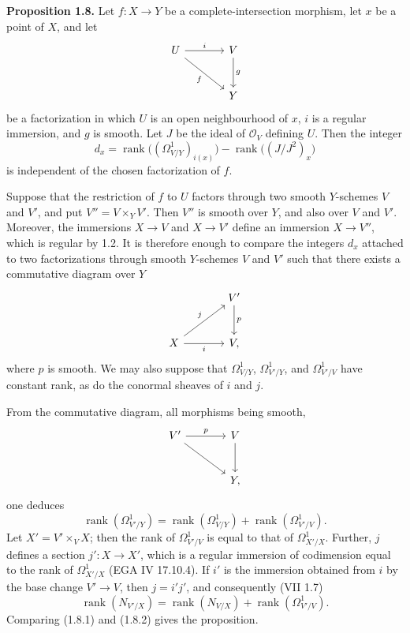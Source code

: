 \textbf{Proposition 1.8.} Let $f:X\to Y$ be a complete-intersection morphism, let $x$ be a point of $X$, and let
\[
\begin{tikzcd}[column sep=large,row sep=large]
U \arrow[r,"i"] \arrow[dr,"f"'] & V \arrow[d,"g"]\\
& Y
\end{tikzcd}
\]
be a factorization in which $U$ is an open neighbourhood of $x$, $i$ is a regular immersion, and $g$ is smooth. Let $J$ be the ideal of $\mathcal O_V$ defining $U$. Then the integer
\[
d_x=\operatorname{rank}\bigl((\Omega^1_{V/Y})_{i(x)}\bigr)-\operatorname{rank}\bigl((J/J^2)_x\bigr)
\]
is independent of the chosen factorization of $f$.

Suppose that the restriction of $f$ to $U$ factors through two smooth $Y$-schemes $V$ and $V'$, and put $V''=V\times_Y V'$. Then $V''$ is smooth over $Y$, and also over $V$ and $V'$. Moreover, the immersions $X\to V$ and $X\to V'$ define an immersion $X\to V''$, which is regular by 1.2. It is therefore enough to compare the integers $d_x$ attached to two factorizations through smooth $Y$-schemes $V$ and $V'$ such that there exists a commutative diagram over $Y$
\[
\begin{tikzcd}[column sep=large,row sep=large]
& V' \arrow[d,"p"]\\
X \arrow[ur,"j"] \arrow[r,"i"'] & V,
\end{tikzcd}
\]
where $p$ is smooth. We may also suppose that $\Omega^1_{V/Y}$, $\Omega^1_{V'/Y}$, and $\Omega^1_{V'/V}$ have constant rank, as do the conormal sheaves of $i$ and $j$.

From the commutative diagram, all morphisms being smooth,
\[
\begin{tikzcd}[column sep=large,row sep=large]
V' \arrow[r,"p"] \arrow[dr] & V \arrow[d]\\
& Y,
\end{tikzcd}
\]
one deduces
\begin{equation}\tag{1.8.1}
\operatorname{rank}(\Omega^1_{V'/Y})=
\operatorname{rank}(\Omega^1_{V/Y})+
\operatorname{rank}(\Omega^1_{V'/V}).
\end{equation}
Let $X'=V'\times_V X$; then the rank of $\Omega^1_{V'/V}$ is equal to that of $\Omega^1_{X'/X}$. Further, $j$ defines a section $j':X\to X'$, which is a regular immersion of codimension equal to the rank of $\Omega^1_{X'/X}$ (EGA IV 17.10.4). If $i'$ is the immersion obtained from $i$ by the base change $V'\to V$, then $j=i'j'$, and consequently (VII 1.7)
\begin{equation}\tag{1.8.2}
\operatorname{rank}(N_{V'/X})=
\operatorname{rank}(N_{V/X})+
\operatorname{rank}(\Omega^1_{V'/V}).
\end{equation}
Comparing (1.8.1) and (1.8.2) gives the proposition.

